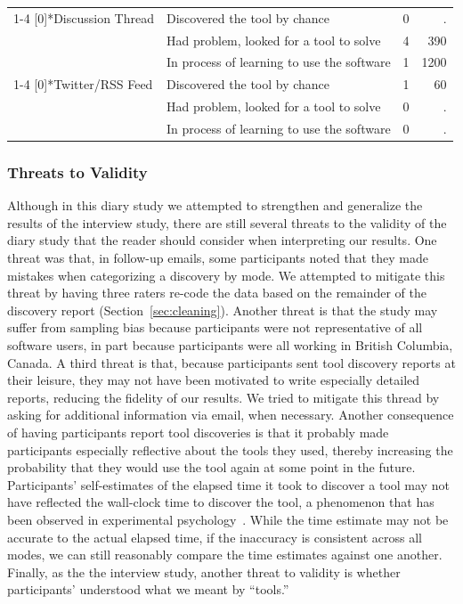 \documentclass[smallextended]{svjour3}
\newcommand\contexts{modes\xspace}
\begin{document}
\begin{table}[t]
\begin{tabularx}{\linewidth}{p{25mm}Xrr}
    \cline{1-4}
    \multirow{3}[0]{*}{Discussion Thread} & Discovered the tool by chance & 0     & .  \\
          & Had problem, looked for a tool to solve & 4     & 390   \\
          & In process of learning to use the software & 1     & 1200  \\

		\cline{1-4}
    \multirow{3}[0]{*}{Twitter/RSS Feed} & Discovered the tool by chance & 1     & 60   \\
          & Had problem, looked for a tool to solve & 0     & .   \\
          & In process of learning to use the software & 0     & .   \\
	\end{tabularx}
\end{table}

\subsubsection{Threats to Validity}

\noindent
Although in this diary study we attempted to strengthen and generalize
the results of the interview study, there are still several
threats to the validity of the diary study that the reader
should consider when interpreting our results.
One threat was that, in follow-up emails, some participants noted that 
they made mistakes when categorizing a discovery by mode.
We attempted to mitigate this threat by having three raters 
re-code the data based on the remainder
of the discovery report (Section~\ref{sec:cleaning}).
Another threat is that the study may suffer from sampling bias because participants were 
not representative of all software users, in part because 
participants were all working in British Columbia, Canada.
A third threat is that, because participants 
sent tool discovery reports at their leisure, 
they may not have been motivated to write especially detailed reports,
reducing the fidelity of our results.
We tried to mitigate this thread by asking for additional information via
email, when necessary.
Another consequence of having participants report tool discoveries
is that it probably made participants especially reflective about the tools
they used, thereby increasing the probability that they would 
use the tool again at some point in the future.
Participants' self-estimates of the elapsed time it 
took to discover a tool may not have reflected the wall-clock time
to discover the tool, a phenomenon that has been observed
in experimental psychology~\cite{huttenlocher1990reports}.
While the time estimate may not be accurate to the actual elapsed time,
if the inaccuracy is consistent across all \contexts,
we can still reasonably compare the time estimates against one another.
Finally, as the the interview study, another threat to validity is 
whether participants' understood what we meant by ``tools.''
\end{document}
